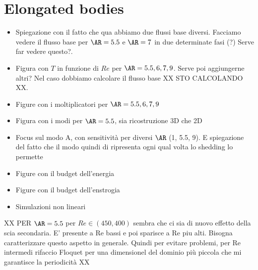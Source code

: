 \section{Elongated bodies}

\begin{itemize}
  \item Spiegazione con il fatto che qua abbiamo due flussi base diversi. Facciamo vedere il flusso base per $\AR=5.5$ e $\AR=7$ in due determinate fasi (?) Serve far vedere questo?.
  \item Figura con $T$ in funzione di $Re$ per $\AR=5.5, 6, 7, 9$. Serve poi aggiungerne altri? Nel caso dobbiamo calcolare il flusso base XX STO CALCOLANDO XX.
  \item Figure con i moltiplicatori per $\AR=5.5, 6, 7, 9$
  \item Figura con i modi per $\AR=5.5$, sia ricostruzione 3D che 2D
  \item Focus sul modo A, con sensitività per diversi $\AR$ (1, 5.5, 9). E spiegazione del fatto che il modo quindi di ripresenta ogni qual volta lo shedding lo permette
  \item Figure con il budget dell'energia
  \item Figure con il budget dell'enstrogia
  \item Simulazioni non lineari
\end{itemize}


XX PER $\AR=5.5$ per $Re \in (450,400)$ sembra che ci sia di nuovo effetto della scia secondaria. E' presente a Re bassi e poi sparisce a Re piu alti. Bisogna caratterizzare questo aspetto in generale. Quindi per evitare problemi, per Re intermedi rifaccio Floquet per una dimensionel del dominio più piccola che mi garantisce la periodicità XX

